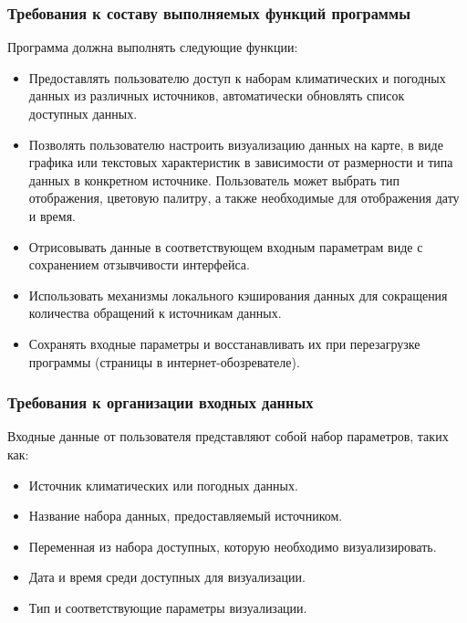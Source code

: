 \documentclass[a4paper, 12pt]{article}
\begin{document}
	\subsubsection{Требования к составу выполняемых функций программы}\label{section:4.1.1}
	Программа должна выполнять следующие функции:
	\begin{itemize}
		\item Предоставлять пользователю доступ к наборам климатических и погодных данных из различных источников,
			автоматически обновлять список доступных данных.

		\item Позволять пользователю настроить визуализацию данных на карте, в виде графика или текстовых характеристик в
			зависимости от размерности и типа данных в конкретном источнике. Пользователь может выбрать тип отображения,
			цветовую палитру, а также необходимые для отображения дату и время.

		\item Отрисовывать данные в соответствующем входным параметрам виде с сохранением отзывчивости интерфейса.

		\item Использовать механизмы локального кэширования данных для сокращения количества обращений к источникам данных.

		\item Сохранять входные параметры и восстанавливать их при перезагрузке программы (страницы в интернет-обозревателе).
	\end{itemize}

	\subsubsection{Требования к организации входных данных}\label{section:4.1.2}
	Входные данные от пользователя представляют собой набор параметров, таких как:
	\begin{itemize}
		\item Источник климатических или погодных данных.

		\item Название набора данных, предоставляемый источником.

		\item Переменная из набора доступных, которую необходимо визуализировать.

		\item Дата и время среди доступных для визуализации.

		\item Тип и соответствующие параметры визуализации.
	\end{itemize}
\end{document}
